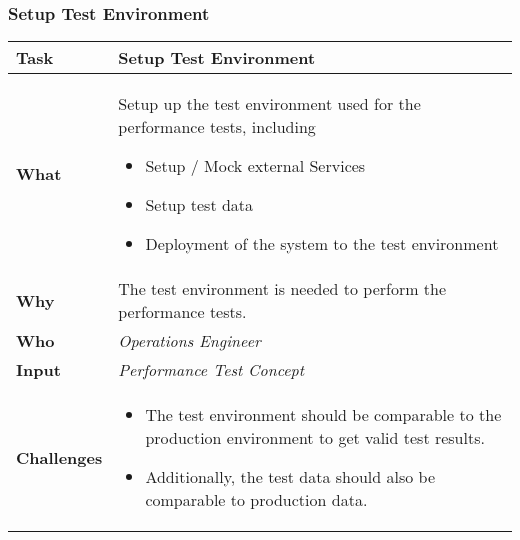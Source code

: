 \subsubsection{Setup Test Environment}
\begin{tabularx}{\textwidth}{@{} l X @{}}
	\caption{Setup Test Environment} \label{table:ch6_Task_Setup_Test_Environment}\\
	\toprule \bfseries Task & Setup Test Environment\\
	\midrule 
	\bfseries What & Setup up the test environment used for the performance tests, including
	\begin{itemize}
		\item Setup / Mock external Services
		\item Setup test data
		\item Deployment of the system to the test environment
	\end{itemize}
	\\
	\midrule 
	\bfseries Why & The test environment is needed to perform the performance tests.\\
	\midrule 
	\bfseries Who & \emph{Operations Engineer}\\
	\midrule 
	\bfseries Input & \emph{Performance Test Concept}\\
	\midrule 
	\bfseries Challenges & 
	\begin{itemize}
		\item The test environment should be comparable to the production environment to get valid test results.
		\item Additionally, the test data should also be comparable to production data.
	\end{itemize}
	\\
	\bottomrule
\end{tabularx}


